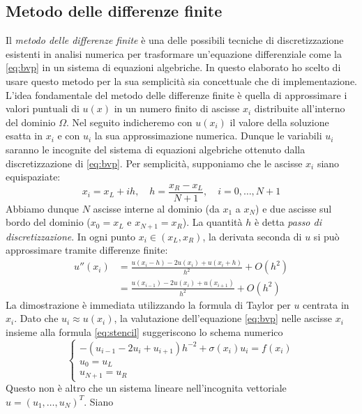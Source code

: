 \documentclass[a4paper,11pt]{article}
\begin{document}
\subsection*{Metodo delle differenze finite}
Il \emph{metodo delle differenze finite} è una delle possibili
tecniche di discretizzazione esistenti in analisi numerica per
trasformare un'equazione differenziale come la \eqref{eq:bvp}
in un sistema di equazioni algebriche. In questo elaborato ho
scelto di usare questo metodo per la sua semplicità sia
concettuale che di implementazione. L'idea fondamentale del
metodo delle differenze finite è quella di approssimare i valori
puntuali di $u(x)$ in un numero finito di ascisse $x_i$ distribuite
all'interno del dominio $\Omega$. Nel seguito indicheremo con
$u(x_i)$ il valore della soluzione esatta in $x_i$ e con $u_i$
la sua approssimazione numerica. Dunque le variabili $u_i$ saranno
le incognite del sistema di equazioni algebriche ottenuto dalla
discretizzazione di \eqref{eq:bvp}. Per semplicità, supponiamo
che le ascisse $x_i$ siano equispaziate:
\[
x_i = x_L + ih, \quad h = \frac{x_R-x_L}{N+1}, \quad i = 0,\dots,N+1
\]
Abbiamo dunque $N$ ascisse interne al dominio (da $x_1$ a $x_N$)
e due ascisse sul bordo del dominio ($x_0 = x_L$ e $x_{N+1} = x_R$).
La quantità $h$ è detta \emph{passo di discretizzazione}.
In ogni punto $x_i \in (x_L,x_R)$, la derivata seconda di $u$ si può
approssimare tramite differenze finite:
\begin{align} \label{eq:stencil}
u''(x_i)
&= \frac{u(x_i-h) - 2u(x_i) + u(x_i+h)}{h^2} + O(h^2) \\
&= \frac{u(x_{i-1}) - 2u(x_i) + u(x_{i+1})}{h^2} + O(h^2)
\end{align}
La dimostrazione è immediata utilizzando la formula di Taylor
per $u$ centrata in $x_i$. Dato che $u_i \approx u(x_i)$, la
valutazione dell'equazione \eqref{eq:bvp} nelle ascisse $x_i$
insieme alla formula \eqref{eq:stencil} suggeriscono lo
schema numerico
\begin{equation} \label{eq:fdm}
\begin{cases}
-(u_{i-1} - 2u_i + u_{i+1})h^{-2} + \sigma(x_i) u_i = f(x_i) \\
u_0 = u_L \\
u_{N+1} = u_R
\end{cases}
\end{equation}
Questo non è altro che un sistema lineare nell'incognita
vettoriale $u = (u_1,\dots,u_N)^T$. Siano
\end{document}
